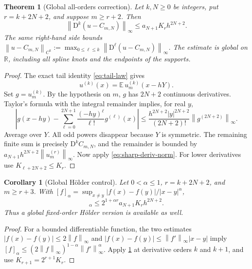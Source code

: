 \documentclass[11pt,a4paper]{article}
\numberwithin{equation}{section}
\newtheorem{theorem}{Theorem}[section]
\newtheorem{corollary}[corollary]{Corollary}
\theoremstyle{definition}
\newcommand{\R}{\mathbb R}
\newcommand{\E}{\mathbb E}
\newcommand{\D}{\mathrm D}
\newcommand{\norm}[1]{\left\lVert #1\right\rVert}
\begin{document}
\begin{theorem}[Global all-orders correction]\label{thm:global}
Let $k,N\geq0$ be integers, put $r=k+2N+2$, and suppose $m\geq r+2$.
Then
\begin{equation}
 \boxed{\ \norm{\D^k(u-C_{m,N})}_\infty
 \leq a_{N+1}K_rh^{2N+2}.\ }
 \label{eq:global-bound}
\end{equation}
The same right-hand side bounds
$\norm{u-C_{m,N}}_{C^k}:=\max_{0\leq\ell\leq k}
\norm{\D^\ell(u-C_{m,N})}_\infty$.
The estimate is global on $\R$, including all spline knots and the
endpoints of the supports.
\end{theorem}
\begin{proof}
The exact tail identity \eqref{eq:tail-law} gives
\begin{equation}
 u^{(k)}(x)=\E\,u_m^{(k)}(x-hY).
 \label{eq:tail-differentiation}
\end{equation}
Set $g=u_m^{(k)}$. By the hypothesis on $m$, $g$ has $2N+2$
continuous derivatives. Taylor's formula with the integral remainder
implies, for real $y$,
\begin{equation}
 \left|g(x-hy)-\sum_{\ell=0}^{2N+1}
             \frac{(-hy)^\ell}{\ell!}g^{(\ell)}(x)\right|
 \leq \frac{h^{2N+2}|y|^{2N+2}}{(2N+2)!}
             \norm{g^{(2N+2)}}_\infty.
\end{equation}
Average over $Y$. All odd powers disappear because $Y$ is symmetric.
The remaining finite sum is precisely $\D^k C_{m,N}$, and the
remainder is bounded by
$a_{N+1}h^{2N+2}\norm{u_m^{(r)}}_\infty$.
Now apply \eqref{eq:sharp-deriv-norm}. For lower derivatives use
$K_{\ell+2N+2}\leq K_r$.
\end{proof}

\begin{corollary}[Global H\"older control]\label{cor:holder}
Let $0<\alpha\leq1$, $r=k+2N+2$, and $m\geq r+3$. With
$[f]_\alpha=\sup_{x\ne y}|f(x)-f(y)|/|x-y|^\alpha$,
\begin{equation}
 [\D^k(u-C_{m,N})]_\alpha
 \leq 2^{1+\alpha r}a_{N+1}K_rh^{2N+2}.
 \label{eq:holder-bound}
\end{equation}
Thus a global fixed-order H\"older version is available as well.
\end{corollary}
\begin{proof}
For a bounded differentiable function, the two estimates
$|f(x)-f(y)|\leq2\norm f_\infty$ and
$|f(x)-f(y)|\leq\norm{f'}_\infty|x-y|$ imply
$[f]_\alpha\leq(2\norm f_\infty)^{1-\alpha}
\norm{f'}_\infty^\alpha$. Apply \cref{thm:global} at derivative
orders $k$ and $k+1$, and use $K_{r+1}=2^{r+1}K_r$.
\end{proof}
\end{document}

